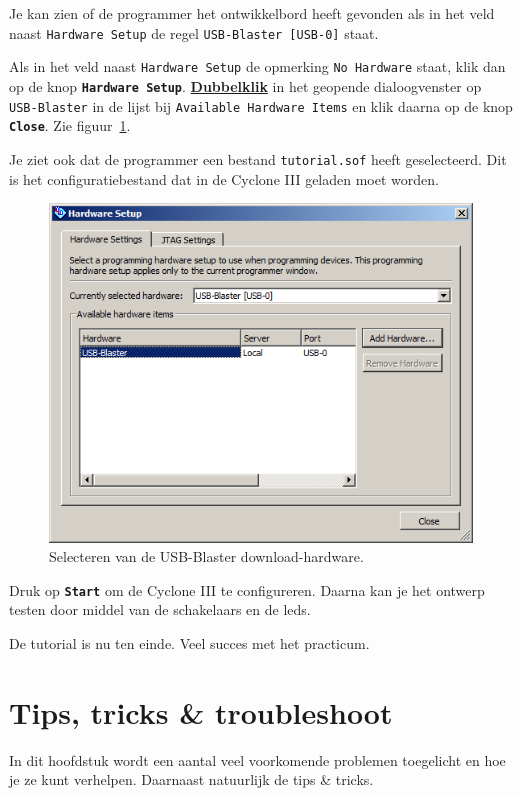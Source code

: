 \documentclass[a4paper,12pt,fleqn,twoside]{book}
\newif\ifbetaversion
\def\tutpicscale{0.455}
\newcommand{\menu}[1]{\texttt{\textbf{#1}}}
\newcommand{\knop}[1]{\texttt{\textbf{#1}}}
\newcommand{\naam}[1]{\texttt{#1}}
\begin{document}
Je kan zien of de programmer het ontwikkelbord heeft gevonden als in het
veld naast \naam{Hardware Setup} de regel \naam{USB-Blaster [USB-0]} 
staat. %

Als in het veld naast \naam{Hardware Setup} de opmerking \naam{No Hardware}
staat, klik dan op de knop \menu{Hardware Setup}.
\textbf{\underline{Dubbelklik}} in het geopende dialoogvenster op
\naam{USB-Blaster} in de lijst bij \naam{Available Hardware Items} en klik
daarna op de knop \menu{Close}. Zie figuur~\ref{fig:055selectusbblaster}.

Je ziet ook dat de programmer een bestand \naam{tutorial.sof} heeft
geselecteerd. Dit is het configuratiebestand dat in de Cyclone III geladen
moet worden.
 
\begin{figure}[H]
\centering
\includegraphics[scale=\tutpicscale]{055selectusbblaster}
\caption{Selecteren van de USB-Blaster download-hardware.}
\label{fig:055selectusbblaster}
\end{figure}

Druk op \knop{Start} om de Cyclone III te configureren. Daarna kan je het
ontwerp testen door middel van de schakelaars en de leds.

De tutorial is nu ten einde. Veel succes met het practicum.


\ifbetaversion

\chapter{Tips, tricks \& troubleshoot}
\label{chap:tipstrickstroubleshoot}
In dit hoofdstuk wordt een aantal veel voorkomende problemen toegelicht en hoe
je ze kunt verhelpen. Daarnaast natuurlijk de tips \& tricks.
\end{document}
